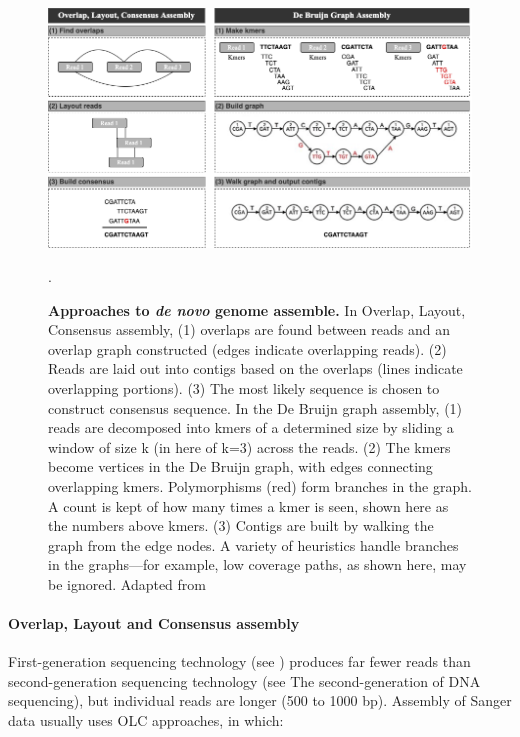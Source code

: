 \begin{figure}[h!]
\centering
\includegraphics[width=\textwidth]{figures/introduction/Figure 8.png}
\caption{\textbf{Approaches to \textit{de novo} genome assemble.} In Overlap, Layout, Consensus assembly, (1) overlaps are found between reads and an overlap graph constructed (edges indicate overlapping reads). (2) Reads are laid out into contigs based on the overlaps (lines indicate overlapping portions). (3) The most likely sequence is chosen to construct consensus sequence. In the De Bruijn graph assembly, (1) reads are decomposed into kmers of a determined size by sliding a window of size k (in here of k=3) across the reads. (2) The kmers become vertices in the De Bruijn graph, with edges connecting overlapping kmers. Polymorphisms (red) form branches in the graph. A count is kept of how many times a kmer is seen, shown here as the numbers above kmers. (3) Contigs are built by walking the graph from the edge nodes. A variety of heuristics handle branches in the graphs—for example, low coverage paths, as shown here, may be ignored. Adapted from \cite{ayling_new_2020}}.
\label{fig:figure8}
\end{figure}

\paragraph{Overlap, Layout and Consensus assembly} \label{sssec:_intro_OLC_assembly} \mbox\\

First-generation sequencing technology (see ) produces far fewer reads than second-generation sequencing technology (see  The second-generation of DNA sequencing), but individual reads are longer (500 to 1000 \ac{bp}). 
Assembly of Sanger data usually uses \ac{OLC} approaches, in which:


